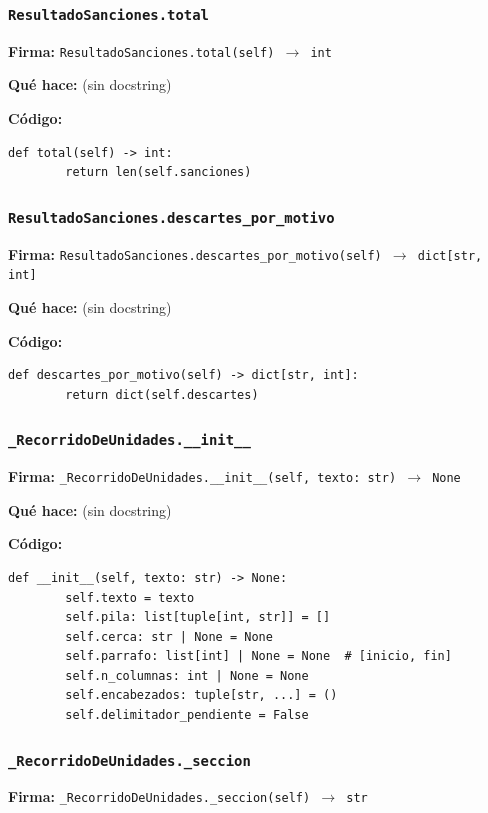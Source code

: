 \documentclass[11pt,a4paper]{article}
\begin{document}
\subsubsection*{\texttt{ResultadoSanciones.total}}
\textbf{Firma:} \texttt{ResultadoSanciones.total(self) $\rightarrow$ int}

\textbf{Qué hace:} (sin docstring)

\textbf{Código:}
\begin{lstlisting}
def total(self) -> int:
        return len(self.sanciones)
\end{lstlisting}

\subsubsection*{\texttt{ResultadoSanciones.descartes\_por\_motivo}}
\textbf{Firma:} \texttt{ResultadoSanciones.descartes\_por\_motivo(self) $\rightarrow$ dict[str, int]}

\textbf{Qué hace:} (sin docstring)

\textbf{Código:}
\begin{lstlisting}
def descartes_por_motivo(self) -> dict[str, int]:
        return dict(self.descartes)
\end{lstlisting}

\subsubsection*{\texttt{\_RecorridoDeUnidades.\_\_init\_\_}}
\textbf{Firma:} \texttt{\_RecorridoDeUnidades.\_\_init\_\_(self, texto: str) $\rightarrow$ None}

\textbf{Qué hace:} (sin docstring)

\textbf{Código:}
\begin{lstlisting}
def __init__(self, texto: str) -> None:
        self.texto = texto
        self.pila: list[tuple[int, str]] = []
        self.cerca: str | None = None
        self.parrafo: list[int] | None = None  # [inicio, fin]
        self.n_columnas: int | None = None
        self.encabezados: tuple[str, ...] = ()
        self.delimitador_pendiente = False
\end{lstlisting}

\subsubsection*{\texttt{\_RecorridoDeUnidades.\_seccion}}
\textbf{Firma:} \texttt{\_RecorridoDeUnidades.\_seccion(self) $\rightarrow$ str}
\end{document}
